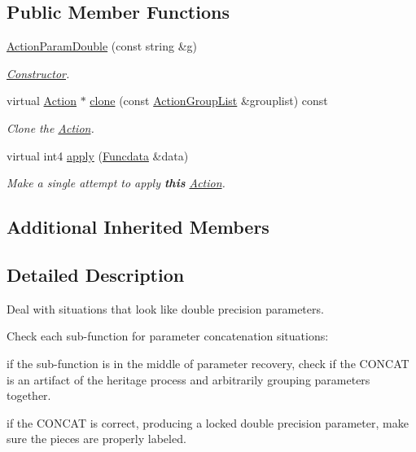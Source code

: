 \subsection*{Public Member Functions}
\begin{DoxyCompactItemize}
\item 
\mbox{\hyperlink{class_action_param_double_ad1003028ad76c95c719279705520f37d}{Action\+Param\+Double}} (const string \&g)
\begin{DoxyCompactList}\small\item\em \mbox{\hyperlink{class_constructor}{Constructor}}. \end{DoxyCompactList}\item 
virtual \mbox{\hyperlink{class_action}{Action}} $\ast$ \mbox{\hyperlink{class_action_param_double_a0db428f4c947a73829164f43f4321d78}{clone}} (const \mbox{\hyperlink{class_action_group_list}{Action\+Group\+List}} \&grouplist) const
\begin{DoxyCompactList}\small\item\em Clone the \mbox{\hyperlink{class_action}{Action}}. \end{DoxyCompactList}\item 
virtual int4 \mbox{\hyperlink{class_action_param_double_a8aad0e7534680ca4a79a20c196da103c}{apply}} (\mbox{\hyperlink{class_funcdata}{Funcdata}} \&data)
\begin{DoxyCompactList}\small\item\em Make a single attempt to apply {\bfseries{this}} \mbox{\hyperlink{class_action}{Action}}. \end{DoxyCompactList}\end{DoxyCompactItemize}
\subsection*{Additional Inherited Members}


\subsection{Detailed Description}
Deal with situations that look like double precision parameters. 

Check each sub-\/function for parameter concatenation situations\+:
\begin{DoxyItemize}
\item if the sub-\/function is in the middle of parameter recovery, check if the C\+O\+N\+C\+AT is an artifact of the heritage process and arbitrarily grouping parameters together.
\item if the C\+O\+N\+C\+AT is correct, producing a locked double precision parameter, make sure the pieces are properly labeled. 
\end{DoxyItemize}

